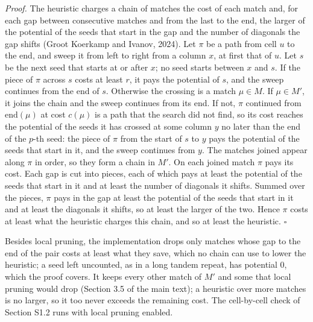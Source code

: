\documentclass[10pt]{article}
\begin{document}
\emph{Proof.} The heuristic charges a chain of matches the cost of each match and, for each gap between consecutive matches and from the last to the end, the larger of the potential of the seeds that start in the gap and the number of diagonals the gap shifts (Groot Koerkamp and Ivanov, 2024). Let \(\pi\) be a path from cell \(u\) to the end, and sweep it from left to right from a column \(x\), at first that of \(u\). Let \(s\) be the next seed that starts at or after \(x\); no seed starts between \(x\) and \(s\). If the piece of \(\pi\) across \(s\) costs at least \(r\), it pays the potential of \(s\), and the sweep continues from the end of \(s\). Otherwise the crossing is a match \(\mu \in M\). If \(\mu \in M'\), it joins the chain and the sweep continues from its end. If not, \(\pi\) continued from \(\mathrm{end}(\mu)\) at cost \(c(\mu)\) is a path that the search did not find, so its cost reaches the potential of the seeds it has crossed at some column \(y\) no later than the end of the \(p\)-th seed: the piece of \(\pi\) from the start of \(s\) to \(y\) pays the potential of the seeds that start in it, and the sweep continues from \(y\). The matches joined appear along \(\pi\) in order, so they form a chain in \(M'\). On each joined match \(\pi\) pays its cost. Each gap is cut into pieces, each of which pays at least the potential of the seeds that start in it and at least the number of diagonals it shifts. Summed over the pieces, \(\pi\) pays in the gap at least the potential of the seeds that start in it and at least the diagonals it shifts, so at least the larger of the two. Hence \(\pi\) costs at least what the heuristic charges this chain, and so at least the heuristic. \(\square\)

Besides local pruning, the implementation drops only matches whose gap to the end of the pair costs at least what they save, which no chain can use to lower the heuristic; a seed left uncounted, as in a long tandem repeat, has potential 0, which the proof covers. It keeps every other match of \(M'\) and some that local pruning would drop (Section 3.5 of the main text); a heuristic over more matches is no larger, so it too never exceeds the remaining cost. The cell-by-cell check of Section S1.2 runs with local pruning enabled.
\end{document}
